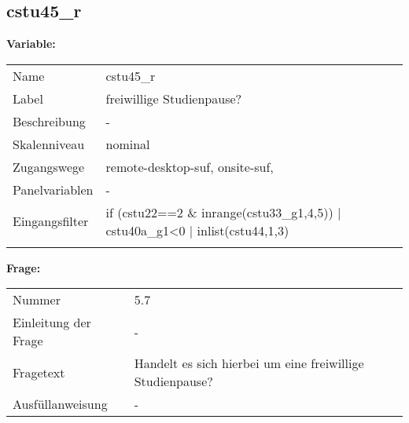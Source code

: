 	
	
	\subsection{cstu45\_r}
	\label{subSection:cstu45_r}

	\noindent\textbf{Variable:}\\
		\begin{tabular}{lL{11.3cm}}
			\label{tableVariable:cstu45_r}
			Name & cstu45\_r \\
			Label & freiwillige Studienpause? \\
			Beschreibung & - \\
			Skalenniveau & nominal \\
			Zugangswege &
				remote-desktop-suf,
				onsite-suf,
 \\
			Panelvariablen & -
			 \\
			Eingangsfilter & if (cstu22==2 \& inrange(cstu33\_g1,4,5)) | cstu40a\_g1\textless{}0 | inlist(cstu44,1,3) \\
 \\
		\end{tabular}

		\vspace*{1 cm}
		\noindent\textbf{Frage:}\\
		\begin{tabular}{lL{11.3cm}}
			\label{tableQuestion:cstu45_r}
			Nummer & 5.7 \\
			Einleitung der Frage & - \\
			Fragetext & Handelt es sich hierbei um eine freiwillige Studienpause? \\
			Ausfüllanweisung & - \\
		\end{tabular}





